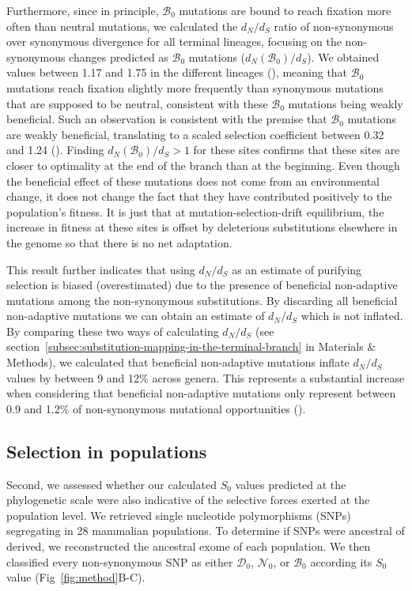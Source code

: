 \documentclass[10pt,letterpaper]{article}
\newcommand{\dn}{d_N}
\newcommand{\ds}{d_S}
\newcommand{\dnds}{\dn / \ds}
\newcommand{\Sphy}{S_{0}}
\newcommand{\SphyDel}{\mathcal{D}_0}
\newcommand{\SphyNeu}{\mathcal{N}_0}
\newcommand{\SphyBen}{\mathcal{B}_0}
\begin{document}
Furthermore, since in principle, $\SphyBen$ mutations are bound to reach fixation more often than neutral mutations, we calculated the $\dnds$ ratio of non-synonymous over synonymous divergence for all terminal lineages, focusing on the non-synonymous changes predicted as $\SphyBen$ mutations ($\dn(\SphyBen) / \ds$).
We obtained values between 1.17 and 1.75 in the different lineages (), meaning that $\SphyBen$ mutations reach fixation slightly more frequently than synonymous mutations that are supposed to be neutral, consistent with these $\SphyBen$ mutations being weakly beneficial.
Such an observation is consistent with the premise that $\SphyBen$ mutations are weakly beneficial, translating to a scaled selection coefficient between 0.32 and 1.24 ().
Finding $\dn(\SphyBen) / \ds > 1$ for these sites confirms that these sites are closer to optimality at the end of the branch than at the beginning.
Even though the beneficial effect of these mutations does not come from an environmental change, it does not change the fact that they have contributed positively to the population’s fitness.
It is just that at mutation-selection-drift equilibrium, the increase in fitness at these sites is offset by deleterious substitutions elsewhere in the genome so that there is no net adaptation.

This result further indicates that using $\dnds$ as an estimate of purifying selection is biased (overestimated) due to the presence of beneficial non-adaptive mutations among the non-synonymous substitutions.
By discarding all beneficial non-adaptive mutations we can obtain an estimate of $\dnds$ which is not inflated.
By comparing these two ways of calculating $\dnds$ (see section~\ref{subsec:substitution-mapping-in-the-terminal-branch} in Materials \& Methods), we calculated that beneficial non-adaptive mutations inflate $\dnds$ values by between 9 and 12\% across genera.
This represents a substantial increase when considering that beneficial non-adaptive mutations only represent between 0.9 and 1.2\% of non-synonymous mutational opportunities ().


\subsection*{Selection in populations}
Second, we assessed whether our calculated $\Sphy$ values predicted at the phylogenetic scale were also indicative of the selective forces exerted at the population level.
We retrieved single nucleotide polymorphisms (SNPs) segregating in 28 mammalian populations.
To determine if SNPs were ancestral of derived, we reconstructed the ancestral exome of each population.
We then classified every non-synonymous SNP as either $\SphyDel$, $\SphyNeu$, or $\SphyBen$ according its $\Sphy$ value (Fig~\ref{fig:method}B-C).
\end{document}
